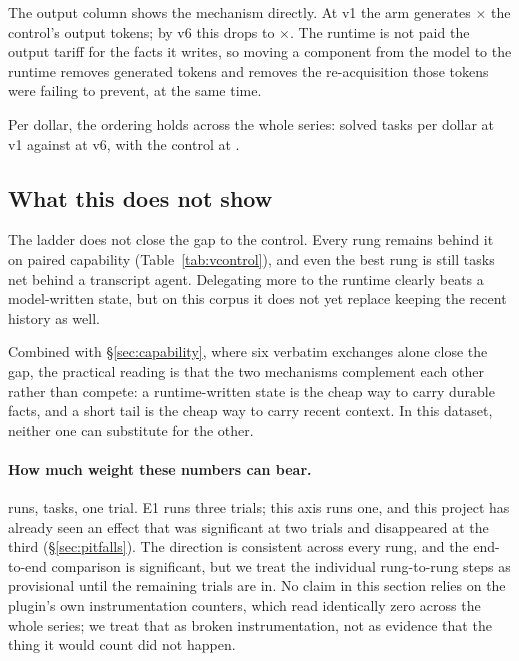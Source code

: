The output column shows the mechanism directly. At v1 the arm generates
\VOutVOne$\times$ the control's output tokens; by v6 this drops to
\VOutVSix$\times$. The runtime is not paid the output tariff for the facts it
writes, so moving a component from the model to the runtime removes generated
tokens and removes the re-acquisition those tokens were failing to prevent,
at the same time.

Per dollar, the ordering holds across the whole series: \VCostPerVOne{}
solved tasks per dollar at v1 against \VCostPerVSix{} at v6, with the control
at \VBaseCostPer.

\subsection{What this does not show}

The ladder does not close the gap to the control. Every rung remains behind
it on paired capability (Table~\ref{tab:vcontrol}), and even the best rung is
still \VCtlVSixNet{} tasks net behind a transcript agent. Delegating more to
the runtime clearly beats a model-written state, but on this corpus it does
not yet replace keeping the recent history as well.

Combined with \S\ref{sec:capability}, where six verbatim exchanges alone
close the gap, the practical reading is that the two mechanisms complement
each other rather than compete: a runtime-written state is the cheap way to
carry durable facts, and a short tail is the cheap way to carry recent
context. In this dataset, neither one can substitute for the other.

\begin{table}[t]
\centering
\caption{Each rung paired against the in-series transcript control.}
\label{tab:vcontrol}

\end{table}

\paragraph{How much weight these numbers can bear.} \VRuns{} runs,
\VTasks{} tasks, one trial. E1 runs three trials; this axis runs one, and
this project has already seen an effect that was significant at two trials
and disappeared at the third (\S\ref{sec:pitfalls}). The direction is
consistent across every rung, and the end-to-end comparison is significant,
but we treat the individual rung-to-rung steps as provisional until the
remaining trials are in. No claim in this section relies on the plugin's own
instrumentation counters, which read identically zero across the whole
series; we treat that as broken instrumentation, not as evidence that the
thing it would count did not happen\live.

